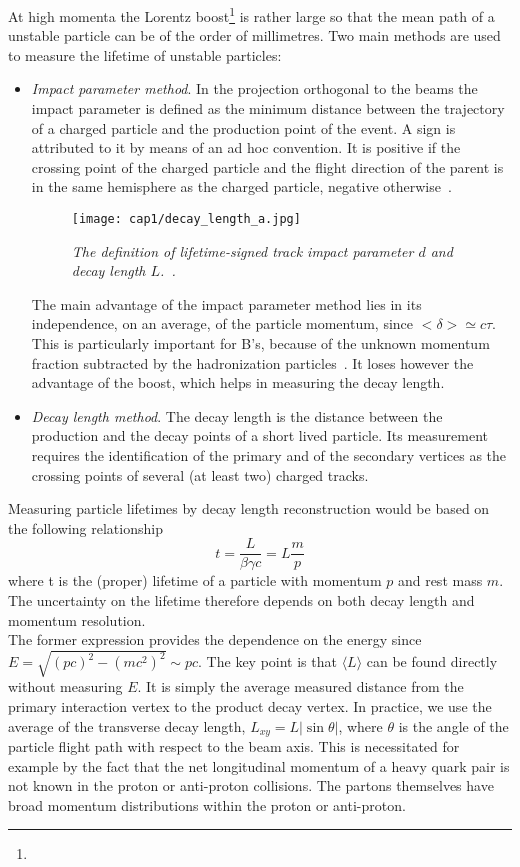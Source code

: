 At high momenta the Lorentz boost\footnote{} is rather large so that the mean
path of a unstable particle can be of the order of millimetres. Two main methods
are used to measure the lifetime of unstable particles:
\begin{itemize}
\item {\it Impact parameter method}. In the projection orthogonal to the beams
  the impact parameter is defined as the minimum distance between the trajectory
  of a charged particle and the production point of the event. A sign is
  attributed to it by means of an ad hoc convention. It is positive if the
  crossing point of the charged particle and the flight direction of the parent
  is in the same hemisphere as the charged particle, negative
  otherwise~.
  \begin{figure}[!htbp]
    \centering\texttt{[image: cap1/decay\_length\_a.jpg]}
    \caption{\textit{The definition of lifetime-signed track impact parameter
        $d$ and decay length $L$.~\cite{Barker}.}}\label{decay_length_a}
  \end{figure}
  The main advantage of the impact parameter method lies in its independence, on
  an average, of the particle momentum, since $<\delta>\simeq c \tau$. This is
  particularly important for B's, because of the unknown momentum fraction
  subtracted by the hadronization particles~\cite{Green}. It loses however the
  advantage of the boost, which helps in measuring the decay length.
\item {\it Decay length method}. The decay length is the distance between the
  production and the decay points of a short lived particle. Its measurement
  requires the identification of the primary and of the secondary vertices as
  the crossing points of several (at least two) charged tracks.
\end{itemize}
Measuring particle lifetimes by decay length reconstruction would be based on
the following relationship
\begin{equation}
  t=\frac{L}{\beta\gamma c} = L\frac{m}{p}
\end{equation}
where t is the (proper) lifetime of a particle with momentum $p$ and rest mass
$m$. The uncertainty on the lifetime therefore depends on
both decay length and momentum resolution.\\
The former expression provides the dependence on the energy since
$E=\sqrt{(pc)^2-(mc^2)^2} \sim pc$. The key point is that $\langle L \rangle$
can be found directly without measuring $E$. It is simply the average measured
distance from the primary interaction vertex to the product decay vertex. In
practice, we use the average of the transverse decay length,
$L_{xy}=L |\sin \theta|$, where $\theta$ is the angle of the particle flight
path with respect to the beam axis. This is necessitated for example by the fact
that the net longitudinal momentum of a heavy quark pair is not known in the
proton or anti-proton collisions. The partons themselves have broad momentum
distributions within the proton or anti-proton.
 




